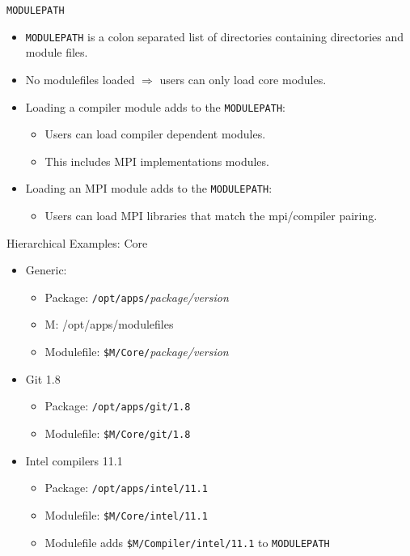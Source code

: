\documentclass{beamer}
\begin{document}
\begin{frame}{\texttt{MODULEPATH}}
  \begin{itemize}
    \item \texttt{MODULEPATH} is a colon separated list of directories
      containing directories and module files.
    \item No modulefiles loaded $\Rightarrow$ users can only load core modules.
    \item Loading a compiler module adds to the \texttt{MODULEPATH}:
      \begin{itemize}
        \item Users can load compiler dependent modules.
        \item This includes MPI implementations modules.
      \end{itemize}
    \item Loading an MPI module adds to the \texttt{MODULEPATH}:
      \begin{itemize}
        \item Users can load MPI libraries that match the mpi/compiler pairing.
      \end{itemize}
  \end{itemize}
\end{frame}


\begin{frame}{Hierarchical Examples: Core}
  \begin{itemize}
    \item Generic:
      \begin{itemize}
        \item Package: \texttt{/opt/apps/}\emph{package/version}
        \item M: {\color{blue}/opt/apps/modulefiles}
        \item Modulefile: \texttt{{\color{blue}\$M}/Core/}\emph{package/version}
      \end{itemize}
    \item Git 1.8
      \begin{itemize}
        \item Package: \texttt{/opt/apps/git/1.8}
        \item Modulefile: \texttt{{\color{blue}\$M}/Core/git/1.8}
      \end{itemize}
    \item Intel compilers 11.1
      \begin{itemize}
        \item Package: \texttt{/opt/apps/intel/11.1}
        \item Modulefile: \texttt{{\color{blue}\$M}/Core/intel/11.1}
        \item Modulefile adds \texttt{{\color{blue}\$M}/Compiler/intel/11.1} to \texttt{MODULEPATH}
      \end{itemize}
  \end{itemize}
\end{frame}
\end{document}
